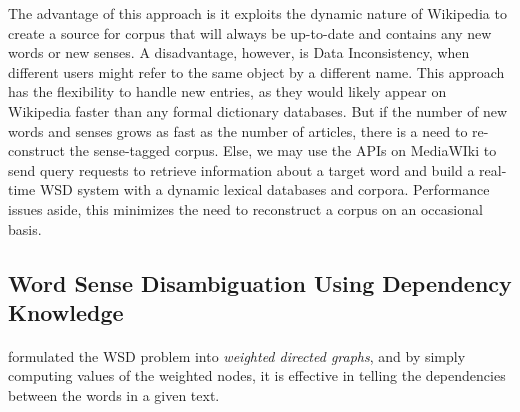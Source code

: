 \documentclass[a4paper,12pt]{nurop}
\begin{document}

The advantage of this approach is it exploits the dynamic nature of Wikipedia to create a source for corpus that will always be up-to-date and contains any new words or new senses. A disadvantage, however, is Data Inconsistency, when different users might refer to the same object by a different name. This approach has the flexibility to handle new entries, as they would likely appear on Wikipedia faster than any formal dictionary databases. But if the number of new words and senses grows as fast as the number of articles, there is a need to re-construct the sense-tagged corpus. Else, we may use the APIs on MediaWIki to send query requests to retrieve information about a target word and build a real-time WSD system with a dynamic lexical databases and corpora. Performance issues aside, this minimizes the need to reconstruct a corpus on an occasional basis.

\subsection{Word Sense Disambiguation Using Dependency Knowledge}
\paragraph{}
\cite{unsupervised} formulated the WSD problem into \textit{weighted directed graphs}, and by simply computing values of the weighted nodes, it is effective in telling the dependencies between the words in a given text.

\end{document}
